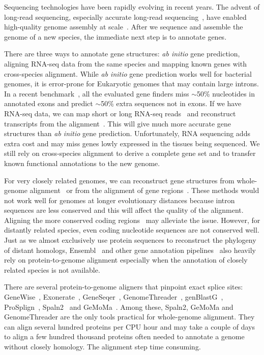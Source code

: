 \documentclass{bioinfo}
\begin{document}
Sequencing technologies have been rapidly evolving in recent years. The advent
of long-read sequencing, especially accurate long-read
sequencing~\citep{Wenger:2019ab}, have enabled high-quality genome assembly at
scale~\citep{Nurk:2020we,Cheng:2021aa,Cheng:2022aa}. After we sequence and
assemble the genome of a new species, the immediate next step is to annotate
genes.

There are three ways to annotate gene structures: \emph{ab initio} gene
prediction, aligning RNA-seq data from the same species and mapping known genes
with cross-species alignment.  While \emph{ab initio} gene prediction works
well for bacterial genomes, it is error-prone for Eukaryotic
genomes that may contain large introns. In a recent
benchmark~\citep{Scalzitti:2020wg}, all the evaluated gene finders miss
$\sim$50\% nucleotides in annotated exons and predict $\sim$50\% extra
sequences not in exons. If we have RNA-seq data, we can map short or long
RNA-seq reads~\citep{Dobin:2013kx,Li:2018ab} and reconstruct transcripts from
the alignment~\citep{Kovaka:2019wf}. This will give much more accurate gene
structures than \emph{ab initio} gene prediction. Unfortunately, RNA sequencing
adds extra cost and may miss genes lowly expressed in the tissues being
sequenced. We still rely on cross-species alignment to derive a complete gene
set and to transfer known functional annotations to the new genome.

For very closely related genomes, we can reconstruct gene structures from
whole-genome alignment~\citep{Fiddes:2018wn} or from the alignment of gene
regions~\citep{Shumate:2020ty}. These methods would not work well for genomes
at longer evolutionary distances because intron sequences are less conserved and
this will affect the quality of the alignment. Aligning the more conserved
coding regions~\citep{Li:2007aa,Gotoh:2008aa} may alleviate the issue. However,
for distantly related species, even coding nucleotide sequences are not
conserved well. Just as we almost exclusively use protein sequences to
reconstruct the phylogeny of distant homologs,
Ensembl~\citep{Aken:2016wr} and other gene annotation
pipelines~\citep{Haas:2008tv,Holt:2011tt,Bruna:2021ug} also heavily rely on
protein-to-genome alignment especially when the annotation of closely related
species is not available.

There are several protein-to-genome aligners that pinpoint exact splice sites:
GeneWise~\citep{Birney:1997vr,Birney:2004uy}, Exonerate~\citep{Slater:2005aa},
GeneSeqer~\citep{Usuka:2000vi},
GenomeThreader~\citep{DBLP:journals/infsof/GremmeBSK05},
genBlastG~\citep{She:2011aa}, ProSplign~\citep{Kapustin:2008tq},
Spaln2~\citep{Gotoh:2008aa,Iwata:2012aa} and GeMoMa~\citep{Keilwagen:2019wz}.
Among these, Spaln2, GeMoMa and
GenomeThreader are the only tools practical for whole-genome alignment. They
can align several hundred proteins per CPU hour and may take a couple of days
to align a few hundred thousand proteins often needed to annotate a genome
without closely homology. The alignment step time consuming.
\end{document}
